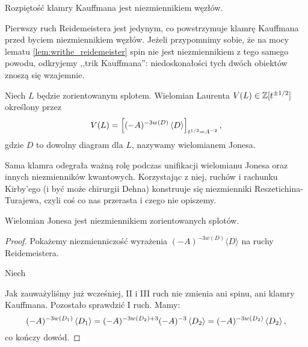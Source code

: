 \begin{corollary}
    Rozpiętość klamry Kauffmana jest niezmiennikiem węzłów.
\end{corollary}

Pierwszy ruch Reidemeistera jest jedynym, co powstrzymuje klamrę Kauffmana przed byciem niezmiennikiem węzłów.
Jeżeli przypomnimy sobie, że na mocy lematu \ref{lem:writhe_reidemeister} spin nie jest niezmiennikiem z tego samego powodu, odkryjemy ,,trik Kauffmana'': niedoskonałości tych dwóch obiektów znoszą się wzajemnie.
%
%

\begin{definition}
\label{def:jones_polynomial}%
    Niech $L$ będzie zorientowanym splotem.
    Wielomian Laurenta $V(L) \in \mathbb Z[t^{\pm 1/2}]$ określony przez
    \begin{equation}
        V(L)=\left[(-A)^{-3w(D)} \left\langle{D}\right\rangle\right]_{t^{1/2}=A^{-2}},
    \end{equation}
    gdzie $D$ to dowolny diagram dla $L$, nazywamy wielomianem Jonesa.
\end{definition}

Sama klamra odegrała ważną rolę podczas unifikacji wielomianu Jonesa oraz innych niezmienników kwantowych.
Korzystając z niej, ruchów i rachunku Kirby'ego (i być może chirurgii Dehna) konstruuje się niezmienniki Reszetichina-Turajewa, czyli coś co nas przerasta i czego nie opiszemy.
%
%
%
%
%

\begin{proposition}
    Wielomian Jonesa jest niezmiennikiem zorientowanych splotów.
\end{proposition}

\begin{proof}
    Pokażemy niezmienniczość wyrażenia $(-A)^{-3w(D)}\langle D\rangle$ na ruchy Reidemeistera.

    Niech
\begin{comment}
    \begin{equation}
        D_1 := \LargeReidemeisterOneLeft,
        \quad\quad\quad
        D_2 := \LargeReidemeisterOneStraight.
    \end{equation}
\end{comment}
    Jak zauważyliśmy już wcześniej, II i III ruch nie zmienia ani spinu, ani klamry Kauffmana.
    Pozostało sprawdzić I ruch.
    Mamy:
    \begin{equation}
        (-A)^{-3 w\left(D_1\right)} \left\langle{D_1}\right\rangle =
        (-A)^{-3 w\left(D_2\right) + 3} (-A)^{-3}\left\langle{D_2}\right\rangle =
        (-A)^{-3 w\left(D_2\right)} \left\langle{D_2}\right\rangle,
    \end{equation}
    co kończy dowód.
\end{proof}

